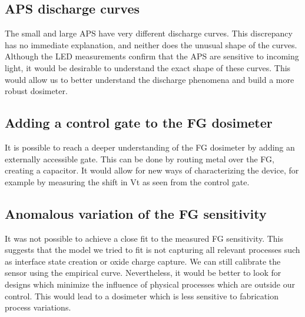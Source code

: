 \subsection{APS discharge curves}
The small and large APS have very different discharge curves.
This discrepancy has no immediate explanation, and neither does the unusual shape of the curves.
Although the LED measurements confirm that the APS are sensitive to incoming light,
it would be desirable to understand the exact shape of these curves.
This would allow us to better understand the discharge phenomena and build a more robust dosimeter.
\subsection{Adding a control gate to the FG dosimeter}
It is possible to reach a deeper understanding of the FG dosimeter by adding an externally accessible gate.
This can be done by routing metal over the FG, creating a capacitor.
It would allow for new ways of characterizing the device,
for example by measuring the shift in Vt as seen from the control gate.
\subsection{Anomalous variation of the FG sensitivity}
It was not possible to achieve a close fit to the measured FG sensitivity.
This suggests that the model we tried to fit is not capturing all relevant processes
such as interface state creation or oxide charge capture.
We can still calibrate the sensor using the empirical curve.
Nevertheless, it would be better to look for designs which minimize
the influence of physical processes which are outside our control.
This would lead to a dosimeter which is less sensitive to fabrication process variations.
